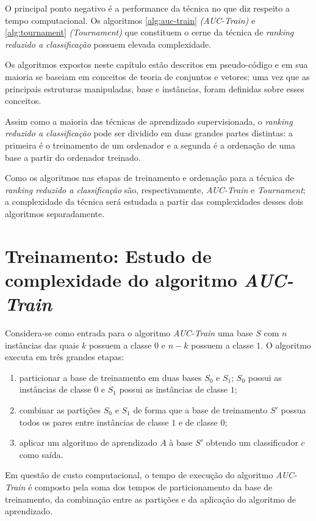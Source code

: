 O principal ponto negativo é a performance da técnica no que diz respeito a tempo computacional. Os algoritmos \ref{alg:auc-train} \emph{(AUC-Train)} e \ref{alg:tournament} \emph{(Tournament)} que constituem o cerne da técnica de \emph{ranking reduzido a classificação} possuem elevada complexidade.

Os algoritmos expostos neste capítulo estão descritos em pseudo-código e em sua maioria se baseiam em conceitos de teoria de conjuntos e vetores; uma vez que as principais estruturas manipuladas, base e instâncias, foram definidas sobre esses conceitos.

Assim como a maioria das técnicas de aprendizado supervisionada, o \emph{ranking reduzido a classificação} pode ser dividido em duas grandes partes distintas: a primeira é o treinamento de um ordenador e a segunda é a ordenação de uma base a partir do ordenador treinado.

Como os algoritmos nas etapas de treinamento e ordenação para a técnica de \emph{ranking reduzido a classificação} são, respectivamente, \emph{AUC-Train} e \emph{Tournament}; a complexidade da técnica será estudada a partir das complexidades desses dois algoritmos separadamente.


\section{Treinamento: Estudo de complexidade do algoritmo \emph{AUC-Train}}

Considera-se como entrada para o algoritmo \emph{AUC-Train} uma base $S$ com $n$ instâncias das quais $k$ possuem a classe $0$ e $n - k$ possuem a classe $1$. O algoritmo executa em três grandes etapas:

\begin{enumerate}
    \item particionar a base de treinamento em duas bases $S_0$ e $S_1$; $S_0$ possui as instâncias de classe $0$ e $S_1$ possui as instâncias de classe $1$;
    \item combinar as partições $S_0$ e $S_1$ de forma que a base de treinamento $S'$ possua todos os pares entre instâncias de classe $1$ e de classe $0$;
    \item aplicar um algoritmo de aprendizado $A$ à base $S'$ obtendo um classificador $c$ como saída.
\end{enumerate}

Em questão de custo computacional, o tempo de execução do algoritmo \emph{AUC-Train} é composto pela soma dos tempos de particionamento da base de treinamento, da combinação entre as partições e da aplicação do algoritmo de aprendizado.

